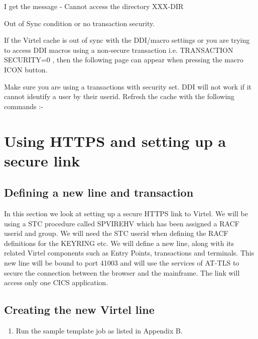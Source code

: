 \documentclass[letterpaper,10pt,english]{sphinxmanual}
\begin{document}
I get the message - Cannot access the directory XXX-DIR



Out of Sync condition or no transaction security.

If the Virtel cache is out of sync with the DDI/macro settings or you are trying to access DDI macros using a non-secure transaction i.e. TRANSACTION SECURITY=0 ,  then the following page can appear when pressing the macro ICON button.


Make sure you are using a transactions with security set. DDI will not work if it cannot identify a user by their userid. Refresh the cache with the following commands :-

\begin{sphinxVerbatim}[commandchars=\\\{\}]
 
\end{sphinxVerbatim}


\chapter{Using HTTPS and setting up a secure link}
\label{\detokenize{TN202002:using-https-and-setting-up-a-secure-link}}

\section{Defining a new line and transaction}
\label{\detokenize{TN202002:defining-a-new-line-and-transaction}}
In this section we look at setting up a secure HTTPS link to Virtel. We will be using a STC procedure called SPVIREHV which has been assigned a RACF userid and group. We will need the STC userid when defining the RACF definitions for the KEYRING etc. We will define a new line, along with its related Virtel components such as Entry Points, transactions and terminals. This new line will be bound to port 41003 and will use the services of AT-TLS to secure the connection between the browser and the mainframe. The link will access only one CICS application.


\section{Creating the new Virtel line}
\label{\detokenize{TN202002:creating-the-new-virtel-line}}\begin{enumerate}
\def\theenumi{\arabic{enumi}}
\def\labelenumi{\theenumi .}
\makeatletter\def\p@enumii{\p@enumi \theenumi .}\makeatother
\item {} 
Run the sample template job as listed in Appendix B.

\end{enumerate}
\end{document}
